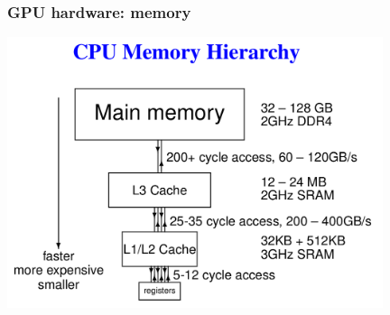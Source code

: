 \begin{frame}[fragile]
  \frametitle{GPU hardware: memory}
\includegraphics[width=11.0cm]{graphs/memory4.png}
\end{frame}